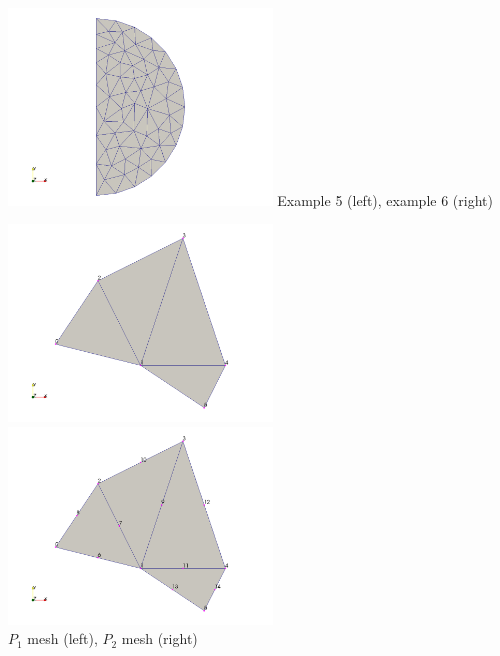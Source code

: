 \begin{center}
\includegraphics[width=7cm]{python_codes/fieldstone_131/example5/example5}
{\captionfont Example 5 (left), example 6 (right)}
\end{center}



\begin{center}
\includegraphics[width=7cm]{python_codes/fieldstone_131/P1P2/meshP1}
\includegraphics[width=7cm]{python_codes/fieldstone_131/P1P2/meshP2}\\
{\captionfont $P_1$ mesh (left), $P_2$ mesh (right)}
\end{center}


